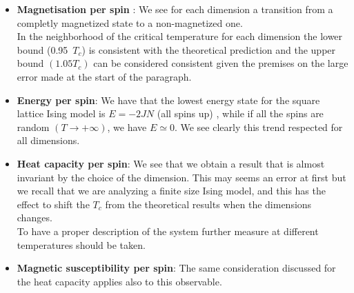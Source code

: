 \begin{itemize}
    \item \textbf{Magnetisation per spin} : We see for each dimension a transition from a completly magnetized state to a non-magnetized one. \\ In the neighborhood of the critical temperature for each dimension the lower bound (0.95\ $T_c$)
    is consistent with the theoretical prediction and the upper bound $(1.05 T_c)$ can be considered consistent given the premises on the large error made at the start of the paragraph.

    \item \textbf{Energy per spin}: We have that the lowest energy state for the square lattice Ising model is $E = -2JN$ (all spins up) , while if all the spins are random $(T \to +\infty)$, we have $E \simeq 0$. We see clearly 
    this trend respected for all dimensions.

    \item \textbf{Heat capacity per spin}: We see that we obtain a result that is almost invariant by the choice of the dimension. This may seems an error at first but we recall that we are 
    analyzing a finite size Ising model, and this has the effect to shift the $T_c$ from the theoretical results when the dimensions changes. \\
    To have a proper description of the system further measure at different temperatures should be taken.
    
    \item \textbf{Magnetic susceptibility per spin}: The same consideration discussed for the heat capacity applies also to this observable.


\end{itemize}


